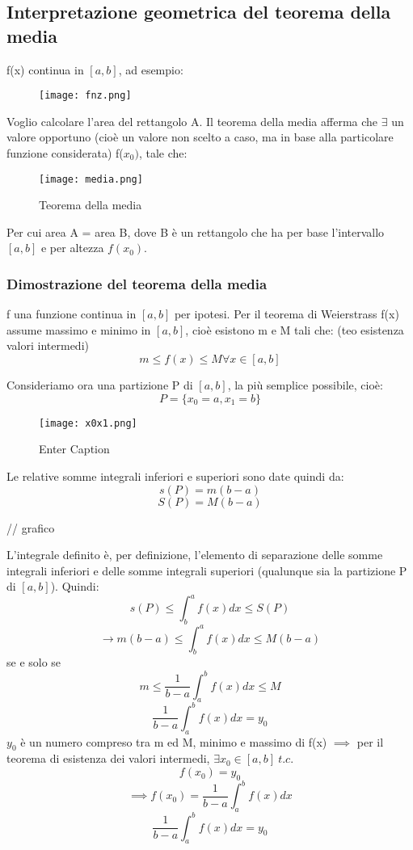 \documentclass[../main.tex]{subfiles}
\begin{document}
\newpage
\subsection{Interpretazione geometrica del teorema della media}
f(x) continua in $[a, b]$, ad esempio:

\begin{figure}[ht]
    \centering
    \texttt{[image: fnz.png]}\label{fig:teorema-media}
\end{figure}

Voglio calcolare l'area del rettangolo A. Il teorema della media afferma che
$\exists$ un valore opportuno (cioè un valore non scelto a caso, ma in base
alla particolare funzione considerata) f($x_0)$, tale che:

\begin{figure}[!ht]
    \centering
    \texttt{[image: media.png]}
    \caption{Teorema della media}\label{fig:media}
\end{figure}

Per cui area A = area B, dove B è un rettangolo che ha per base l'intervallo
$[a, b]$ e per altezza $f(x_0)$.

\subsubsection{Dimostrazione del teorema della media}
f una funzione continua in $[a, b]$ per ipotesi. Per il teorema di Weierstrass
f(x) assume massimo e minimo in $[a, b]$, cioè esistono m e M tali che: (teo
esistenza valori intermedi)\[m\leq f(x) \leq M \forall x \in [a, b]\]

Consideriamo ora una partizione P di $[a, b]$, la più semplice possibile, cioè:
\[P = \{x_0 = a, x_1 = b\}\]

\begin{figure}[!ht]
    \centering
    \texttt{[image: x0x1.png]}
    \caption{Enter Caption}\label{fig:enter-label}
\end{figure}

Le relative somme integrali inferiori e superiori sono date quindi da:\[s(P) =
    m(b-a)\]\[S(P) = M(b-a)\]

// grafico

L'integrale definito è, per definizione, l'elemento di separazione delle somme
integrali inferiori e delle somme integrali superiori (qualunque sia la
partizione P di $[a, b]$). Quindi:\[s(P) \leq \int_b^af(x)dx \leq S(P)\]
\[\rightarrow m(b-a) \leq \int_b^af(x)dx \leq M(b-a)\] se e solo se\[m \leq
    \frac{1}{b-a}\int_a^bf(x)dx \leq M\]\[\frac{1}{b-a}\int_a^bf(x)dx = y_0\]
$y_0$ è un numero compreso tra m ed M, minimo e massimo di f(x) $\implies$ per
il teorema di esistenza dei valori intermedi, $\exists x_0 \in [a, b] \ t.c.$
\[f(x_0)=y_0\]\[\implies f(x_0) = \frac{1}{b-a}\int_a^bf(x)dx\]
\[\frac{1}{b-a}\int_a^bf(x)dx = y_0\]
\end{document}
